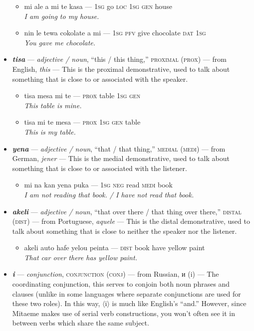 \documentclass[a4paper]{article}
\begin{document}
\begin{itemize}
	\begin{itemize}
		\item mi ale a mi te kasa — \textsc{1sg} go \textsc{loc 1sg gen} house \\\textit{I am going to my house.}
		\item nin le tewa cokolate a mi — \textsc{1sg pfv} give chocolate \textsc{dat 1sg} \\\textit{You gave me chocolate.}
	\end{itemize}
	\item \textbf{\textit{tisa}} — \textit{adjective / noun}, ``this / this thing,'' \textsc{proximal (prox)} — from English, \textit{this} — This is the proximal demonstrative, used to talk about something that is close to or associated with the speaker.
	\begin{itemize}
		\item tisa mesa mi te — \textsc{prox} table \textsc{1sg gen} \\\textit{This table is mine.}
		\item tisa mi te mesa — \textsc{prox 1sg gen} table \\\textit{This is my table.}
	\end{itemize}
	\item \textbf{\textit{yena}} — \textit{adjective / noun}, ``that / that thing,'' \textsc{medial (medi)}  — from German, \textit{jener} — This is the medial demonstrative, used to talk about something that is close to or associated with the listener.
	\begin{itemize}
		\item mi na kan yena puka — \textsc{1sg neg} read \textsc{medi} book \\\textit{I am not reading that book. / I have not read that book.}
	\end{itemize}
	\item \textbf{\textit{akeli}} — \textit{adjective / noun}, ``that over there / that thing over there,'' \textsc{distal (dist)}  — from Portuguese, \textit{aquele} — This is the distal demonstrative, used to talk about something that is close to neither the speaker nor the listener.
	\begin{itemize}
		\item akeli auto hafe yelou peinta — \textsc{dist} book have yellow paint \\\textit{That car over there has yellow paint.}
	\end{itemize}
	\item \textbf{\textit{i}} — \textit{conjunction}, \textsc{conjunction (conj)}  — from Russian, и (i) — The coordinating conjunction, this serves to conjoin both noun phrases and clauses (unlike in some languages where separate conjunctions are used for these two roles). In this way, $\langle$i$\rangle$ is much like English's ``and.'' However, since Mitaeme makes use of serial verb constructions, you won't often see it in between verbs which share the same subject.

\end{itemize}
\end{document}
